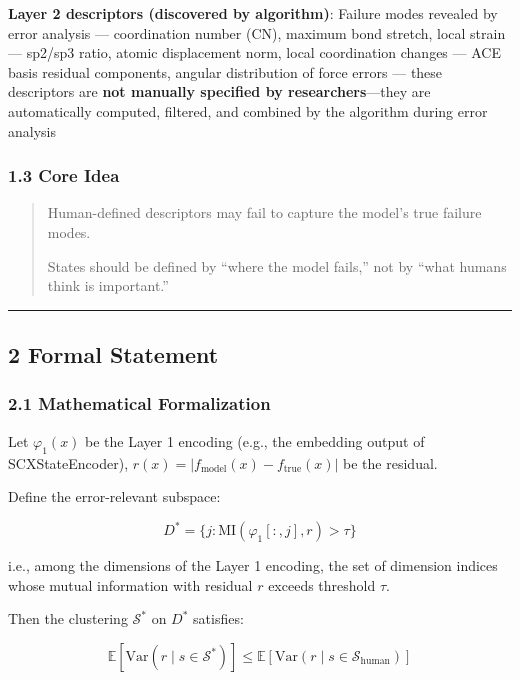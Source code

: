 \documentclass[
  12pt,
]{article}
\begin{document}
\textbf{Layer 2 descriptors (discovered by algorithm)}: Failure modes revealed by error analysis ---
coordination number (CN), maximum bond stretch, local strain ---
sp2/sp3 ratio, atomic displacement norm, local coordination changes ---
ACE basis residual components, angular distribution of force errors ---
these descriptors are \textbf{not manually specified by researchers}---they are automatically computed, filtered, and combined by the algorithm during error analysis

\subsubsection{1.3 Core Idea}\label{core-idea-prop6}

\begin{quote}
Human-defined descriptors may fail to capture the model's true failure modes.

States should be defined by ``where the model fails,'' not by ``what humans think is important.''
\end{quote}

\begin{center}\rule{0.5\linewidth}{0.5pt}\end{center}

\subsection{2 Formal Statement}\label{formal-statement-detail}

\subsubsection{2.1 Mathematical Formalization}\label{mathematical-formalization}

Let \(\varphi_1(x)\) be the Layer 1 encoding (e.g., the embedding output of SCXStateEncoder),
\(r(x) = |f_{\text{model}}(x) - f_{\text{true}}(x)|\)
be the residual.

Define the error-relevant subspace:

\[D^* = \{j: \text{MI}(\varphi_1[:, j], r) > \tau\}\]

i.e., among the dimensions of the Layer 1 encoding, the set of dimension indices whose mutual information with residual \(r\) exceeds threshold \(\tau\).

Then the clustering \(\mathcal{S}^*\) on \(D^*\) satisfies:

\[\mathbb{E}[\text{Var}(r \mid s \in \mathcal{S}^*)] \leq \mathbb{E}[\text{Var}(r \mid s \in \mathcal{S}_{\text{human}})]\]
\end{document}
